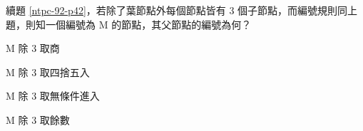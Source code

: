 \ifx\ntpcNinetyTwo\undefined[92學年基北區] \fi
\label{ntpc-92-p43} 續題 \ref{ntpc-92-p42}，若除了葉節點外每個節點皆有 3 個子節點，而編號規則同上題，則知一個編號為 M 的節點，其父節點的編號為何？
  \begin{optionlist}
  \item M 除 3 取商
  \item M 除 3 取四捨五入\label{ntpc-92-a43}
  \item M 除 3 取無條件進入
  \item M 除 3 取餘數
  \end{optionlist}